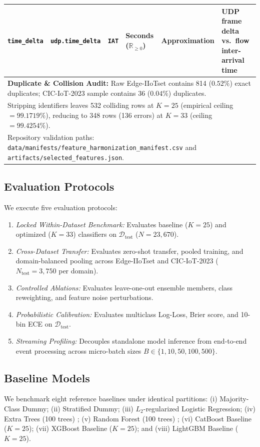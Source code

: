\documentclass[10pt,journal,twocolumn]{IEEEtran}
\begin{document}
\begin{table}[t]
{\begin{tabular}{llllll}
\texttt{time\_delta} & \texttt{udp.time\_delta} & \texttt{IAT} & Seconds ($\mathbb{R}_{\ge 0}$) & Approximation & UDP frame delta vs.\ flow inter-arrival time \\
\midrule
\multicolumn{6}{l}{\textbf{Duplicate \& Collision Audit:} Raw Edge-IIoTset contains 814 ($0.52\%$) exact duplicates; CIC-IoT-2023 sample contains 36 ($0.04\%$) duplicates.} \\
\multicolumn{6}{l}{Stripping identifiers leaves 532 colliding rows at $K=25$ (empirical ceiling $=99.1719\%$), reducing to 348 rows (136 errors) at $K=33$ (ceiling $=99.4254\%$).} \\
\multicolumn{6}{l}{\footnotesize Repository validation paths: \texttt{data/manifests/feature\_harmonization\_manifest.csv} and \texttt{artifacts/selected\_features.json}.} \\
\bottomrule
\end{tabular}}
\end{table}

\subsection{Evaluation Protocols}
We execute five evaluation protocols:
\begin{enumerate}
    \item \emph{Locked Within-Dataset Benchmark:} Evaluates baseline ($K=25$) and optimized ($K=33$) classifiers on $\mathcal{D}_{\text{test}}$ ($N=23,670$).
    \item \emph{Cross-Dataset Transfer:} Evaluates zero-shot transfer, pooled training, and domain-balanced pooling across Edge-IIoTset and CIC-IoT-2023 ($N_{\text{test}}=3,750$ per domain).
    \item \emph{Controlled Ablations:} Evaluates leave-one-out ensemble members, class reweighting, and feature noise perturbations.
    \item \emph{Probabilistic Calibration:} Evaluates multiclass Log-Loss, Brier score, and 10-bin ECE on $\mathcal{D}_{\text{test}}$.
    \item \emph{Streaming Profiling:} Decouples standalone model inference from end-to-end event processing across micro-batch sizes $B \in \{1, 10, 50, 100, 500\}$.
\end{enumerate}

\subsection{Baseline Models}
We benchmark eight reference baselines under identical partitions: (i) Majority-Class Dummy; (ii) Stratified Dummy; (iii) $L_2$-regularized Logistic Regression; (iv) Extra Trees (100 trees) \cite{ref13}; (v) Random Forest (100 trees) \cite{ref12}; (vi) CatBoost Baseline ($K=25$); (vii) XGBoost Baseline ($K=25$); and (viii) LightGBM Baseline ($K=25$).
\end{document}
